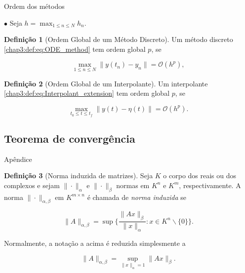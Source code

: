 \documentclass{beamer}
\theoremstyle{plain}
\theoremstyle{definition}
\newtheorem{defi}{Definição}
\begin{document}
\begin{frame}{Ordem dos métodos}

    \phantom{aa} $\bullet$ Seja $h = \max_{1 \leq n \leq N} h_n$.

    \begin{defi}[Ordem Global de um Método Discreto]
        
        Um método discreto \eqref{chap3:def:eq:ODE_method} tem ordem global $p$, se 

        \begin{equation}
            \max_{1 \leq n \leq N} \| y(t_n) - y_n \| = \mathcal{O}(h^p),
        \end{equation}
    \end{defi}


    \begin{defi}[Ordem Global de um Interpolante]
        
        Um interpolante \eqref{chap3:def:eq:Interpolant_extension} tem ordem global $p$, se 

        \begin{equation}
            \max_{t_0 \leq t \leq t_f} \| y(t) - \eta(t) \| = \mathcal{O}(h^{p}).
        \end{equation}
    \end{defi}

\end{frame}

\subsection{Teorema de convergência}

\begin{frame}{Apêndice}
    \begin{defi}[Norma induzida de matrizes]
        \label{apendices:def:induced_matrix_norm}
        Seja $K$ o corpo dos reais ou dos complexos e sejam $\|\cdot\|_\alpha$ e $\|\cdot\|_\beta$ normas em $K^n$ e $K^m$, respectivamente.
        A norma $\| \cdot \|_{\alpha, \beta}$ em $K^{m \times n}$ é chamada de \textit{norma induzida} se 

        \noindent
        \[ \| A \|_{\alpha, \beta} = \sup\{\frac{\|Ax\|_\beta}{\|x\|_\alpha} : x\in K^n \backslash \{0\} \}. \]


        Normalmente, a notação a acima é reduzida simplesmente a 

        \noindent
        \[ \| A \|_{\alpha, \beta} = \sup_{\|x\|_\alpha = 1} \|Ax\|_\beta.\]

    \end{defi}


\end{frame}
\end{document}
